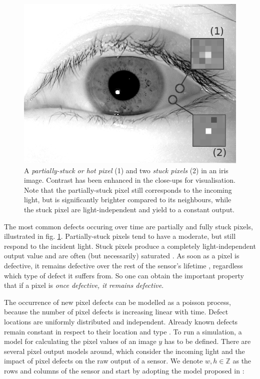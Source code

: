 \documentclass[10pt,twocolumn,letterpaper]{article}
\begin{document}
\begin{figure}
\centering
\includegraphics[width=0.7\linewidth]{img/defects.png}
\caption{A \emph{partially-stuck or hot pixel} (1) and two \emph{stuck pixels} (2) in an iris image. Contrast has been enhanced in the close-ups for visualisation. Note that the partially-stuck pixel still corresponds to the incoming light, but is significantly brighter compared to its neighbours, while the stuck pixel are light-independent and yield to a constant output.  }
\label{fig:hotStuck}
\end{figure}

The most common defects occuring over time are partially and fully stuck pixels, illustrated in fig. \ref{fig:hotStuck}. Partially-stuck pixels tend to have a moderate, but still respond to the incident light. Stuck pixels produce a completely light-independent output value and are often (but necessarily) saturated \cite{fridrich}. As soon as a pixel is defective, it remains defective over the rest of the sensor's lifetime \cite{failureSemi}, regardless which type of defect it suffers from. So one can obtain the important property that if a pixel is \emph{once defective, it remains defective}.

The occurrence of new pixel defects can be modelled as a poisson process, because the number of pixel defects is increasing linear with time. Defect locations are uniformly distributed and independent. Already known defects remain constant in respect to their location and type \cite{fridrich, defectIdentification}. 
To run a simulation, a model for calculating the pixel values of an image $y$ has to be defined. There are several pixel output models around, which consider the incoming light and the impact of pixel defects on the raw output of a sensor. We denote $w,h \in \mathbb{Z}$ as the rows and columns of the sensor and start by adopting the model proposed in \cite{fridrich}:
\end{document}
